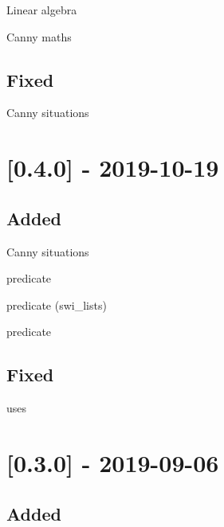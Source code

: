 \begin{shortlist}
    \item Linear algebra
    \item Canny maths
\end{shortlist}

\subsection{Fixed}

\begin{shortlist}
    \item Canny situations
\end{shortlist}

\section{[0.4.0] - 2019-10-19}

\subsection{Added}

\begin{shortlist}
    \item Canny situations
    \item {} predicate
    \item {} predicate (swi_lists)
    \item {} predicate
\end{shortlist}

\subsection{Fixed}

\begin{shortlist}
    \item {} uses 
\end{shortlist}

\section{[0.3.0] - 2019-09-06}

\subsection{Added}

